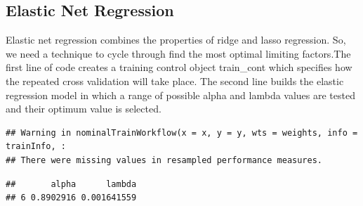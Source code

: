 \documentclass[
]{book}
\newenvironment{Shaded}{\begin{snugshade}}{\end{snugshade}}
\newcommand{\AttributeTok}[1]{\textcolor[rgb]{0.77,0.63,0.00}{#1}}
\newcommand{\CommentTok}[1]{\textcolor[rgb]{0.56,0.35,0.01}{\textit{#1}}}
\newcommand{\DecValTok}[1]{\textcolor[rgb]{0.00,0.00,0.81}{#1}}
\newcommand{\FloatTok}[1]{\textcolor[rgb]{0.00,0.00,0.81}{#1}}
\newcommand{\FunctionTok}[1]{\textcolor[rgb]{0.00,0.00,0.00}{#1}}
\newcommand{\NormalTok}[1]{#1}
\newcommand{\OtherTok}[1]{\textcolor[rgb]{0.56,0.35,0.01}{#1}}
\newcommand{\SpecialCharTok}[1]{\textcolor[rgb]{0.00,0.00,0.00}{#1}}
\begin{document}
\hypertarget{elastic-net-regression}{%
\subsection{Elastic Net Regression}\label{elastic-net-regression}}

Elastic net regression combines the properties of ridge and lasso regression. So, we need a technique to cycle through find the most optimal limiting factors.The first line of code creates a training control object train\_cont which specifies how the repeated cross validation will take place. The second line builds the elastic regression model in which a range of possible alpha and lambda values are tested and their optimum value is selected. \citet{regression_r}

\begin{verbatim}
## Warning in nominalTrainWorkflow(x = x, y = y, wts = weights, info = trainInfo, :
## There were missing values in resampled performance measures.
\end{verbatim}

\begin{Shaded}
\end{Shaded}

\begin{verbatim}
##       alpha      lambda
## 6 0.8902916 0.001641559
\end{verbatim}

\begin{Shaded}
\end{Shaded}

\begin{Shaded}
\end{Shaded}
\end{document}
